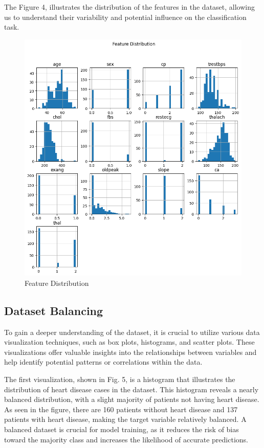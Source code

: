 The Figure 4, illustrates the distribution of the features in the dataset, allowing us to understand their variability and potential influence on the classification task.

\begin{figure}[H]
    \centering
    \includegraphics[width=1\linewidth]{images/feature_destribution.png}
    \caption{Feature Distribution}
    \label{fig:enter-label}
\end{figure}

\subsection{Dataset Balancing}

To gain a deeper understanding of the dataset, it is crucial to utilize various data visualization techniques, such as box plots, histograms, and scatter plots. These visualizations offer valuable insights into the relationships between variables and help identify potential patterns or correlations within the data.

The first visualization, shown in Fig. 5, is a histogram that illustrates the distribution of heart disease cases in the dataset. This histogram reveals a nearly balanced distribution, with a slight majority of patients not having heart disease. As seen in the figure, there are 160 patients without heart disease and 137 patients with heart disease, making the target variable relatively balanced. A balanced dataset is crucial for model training, as it reduces the risk of bias toward the majority class and increases the likelihood of accurate predictions.

